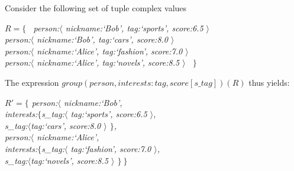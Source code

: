 Consider the following set of tuple complex values

\vspace*{0.25cm}
	\noindent \hspace*{0.5cm} \textit{$R=\{$ \ person:$\langle$ nickname:`Bob', tag:`sports', score:6.5 $\rangle$}	\\
	\hspace*{1.5cm} \textit{person:$\langle$ nickname:`Bob', tag:`cars', score:8.0 $\rangle$}	\\
	\hspace*{1.5cm} \textit{person:$\langle$ nickname:`Alice', tag:`fashion', score:7.0 $\rangle$}	\\
	\hspace*{1.5cm} \textit{person:$\langle$ nickname:`Alice', tag:`novels', score:8.5 $\rangle$ \ $\}$ }

\vspace*{0.25cm}
The expression $group(person, interests:tag, score[s\_tag])(R)$ thus yields:

\vspace{0.25cm}
	\noindent \hspace*{0.5cm} \textit{$R'=\{$ person:$\langle$ nickname:`Bob',}	\\
	\hspace*{2.3cm} \textit{interests:$\{$s\_tag:$\langle$ tag:`sports', score:6.5 $\rangle$,} \\
	\hspace*{3.9cm} \textit{s\_tag:$\langle$tag:`cars', score:8.0 $\rangle$ $\}$,} \\
	\hspace*{1.7cm} \textit{person:$\langle$ nickname:`Alice',}	\\
	\hspace*{2.3cm} \textit{interests:$\{$s\_tag:$\langle$ tag:`fashion', score:7.0 $\rangle$,} \\
	\hspace*{3.9cm} \textit{s\_tag:$\langle$tag:`novels', score:8.5 $\rangle$ $\} \ \}$}






